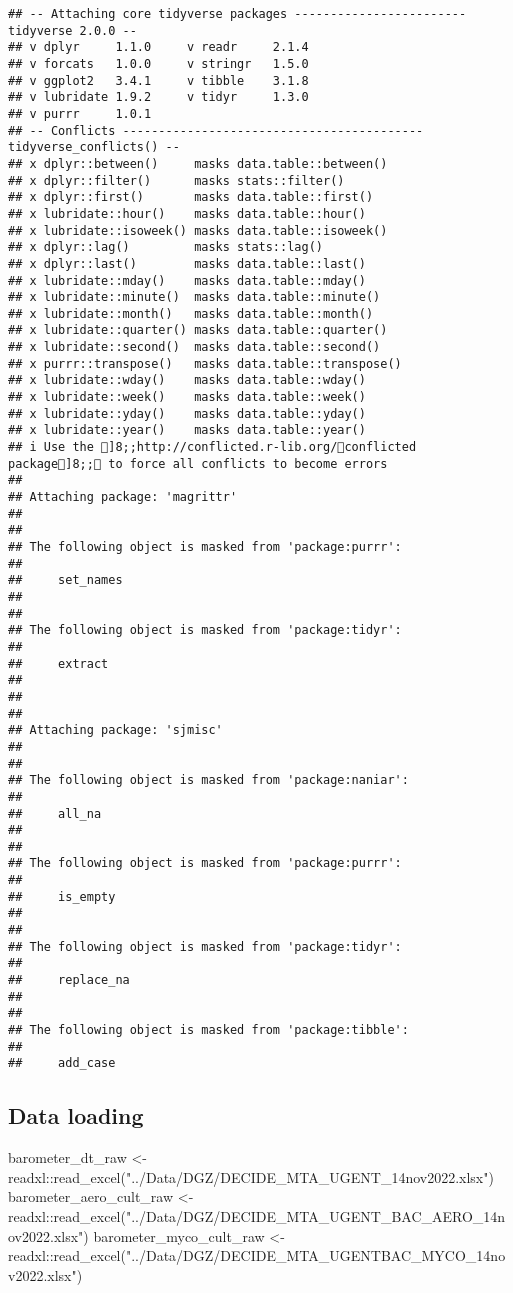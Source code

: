 \documentclass[
]{article}
\newenvironment{Shaded}{\begin{snugshade}}{\end{snugshade}}
\newcommand{\FunctionTok}[1]{\textcolor[rgb]{0.00,0.00,0.00}{#1}}
\newcommand{\NormalTok}[1]{#1}
\newcommand{\OtherTok}[1]{\textcolor[rgb]{0.56,0.35,0.01}{#1}}
\newcommand{\SpecialCharTok}[1]{\textcolor[rgb]{0.00,0.00,0.00}{#1}}
\newcommand{\StringTok}[1]{\textcolor[rgb]{0.31,0.60,0.02}{#1}}
\begin{document}
\begin{verbatim}
## -- Attaching core tidyverse packages ------------------------ tidyverse 2.0.0 --
## v dplyr     1.1.0     v readr     2.1.4
## v forcats   1.0.0     v stringr   1.5.0
## v ggplot2   3.4.1     v tibble    3.1.8
## v lubridate 1.9.2     v tidyr     1.3.0
## v purrr     1.0.1     
## -- Conflicts ------------------------------------------ tidyverse_conflicts() --
## x dplyr::between()     masks data.table::between()
## x dplyr::filter()      masks stats::filter()
## x dplyr::first()       masks data.table::first()
## x lubridate::hour()    masks data.table::hour()
## x lubridate::isoweek() masks data.table::isoweek()
## x dplyr::lag()         masks stats::lag()
## x dplyr::last()        masks data.table::last()
## x lubridate::mday()    masks data.table::mday()
## x lubridate::minute()  masks data.table::minute()
## x lubridate::month()   masks data.table::month()
## x lubridate::quarter() masks data.table::quarter()
## x lubridate::second()  masks data.table::second()
## x purrr::transpose()   masks data.table::transpose()
## x lubridate::wday()    masks data.table::wday()
## x lubridate::week()    masks data.table::week()
## x lubridate::yday()    masks data.table::yday()
## x lubridate::year()    masks data.table::year()
## i Use the ]8;;http://conflicted.r-lib.org/conflicted package]8;; to force all conflicts to become errors
## 
## Attaching package: 'magrittr'
## 
## 
## The following object is masked from 'package:purrr':
## 
##     set_names
## 
## 
## The following object is masked from 'package:tidyr':
## 
##     extract
## 
## 
## 
## Attaching package: 'sjmisc'
## 
## 
## The following object is masked from 'package:naniar':
## 
##     all_na
## 
## 
## The following object is masked from 'package:purrr':
## 
##     is_empty
## 
## 
## The following object is masked from 'package:tidyr':
## 
##     replace_na
## 
## 
## The following object is masked from 'package:tibble':
## 
##     add_case
\end{verbatim}

\hypertarget{data-loading}{%
\subsection{Data loading}\label{data-loading}}

\begin{Shaded}
\begin{Highlighting}[]
\NormalTok{barometer\_dt\_raw }\OtherTok{\textless{}{-}}\NormalTok{ readxl}\SpecialCharTok{::}\FunctionTok{read\_excel}\NormalTok{(}\StringTok{"../Data/DGZ/DECIDE\_MTA\_UGENT\_14nov2022.xlsx"}\NormalTok{)}
\NormalTok{barometer\_aero\_cult\_raw }\OtherTok{\textless{}{-}}\NormalTok{ readxl}\SpecialCharTok{::}\FunctionTok{read\_excel}\NormalTok{(}\StringTok{"../Data/DGZ/DECIDE\_MTA\_UGENT\_BAC\_AERO\_14nov2022.xlsx"}\NormalTok{)}
\NormalTok{barometer\_myco\_cult\_raw }\OtherTok{\textless{}{-}}\NormalTok{ readxl}\SpecialCharTok{::}\FunctionTok{read\_excel}\NormalTok{(}\StringTok{"../Data/DGZ/DECIDE\_MTA\_UGENTBAC\_MYCO\_14nov2022.xlsx"}\NormalTok{)}
\end{Highlighting}
\end{Shaded}
\end{document}
